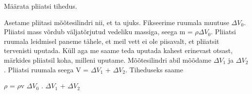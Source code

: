 
Määrata pliiatsi tihedus.

\hint

\solu
Asetame pliitasi mõõtesilindri nii, et ta ujuks. Fikseerime ruumala muutuse $\Delta$$V_0$. Pliiatsi mass võrdub väljatõrjutud vedeliku massiga, seega m = $\rho\Delta$$V_0$. Pliiatsi ruumala leidmisel paneme tähele, et meil vett ei ole piisavalt, et pliiatsit tervenisti uputada. Küll aga me saame teda uputada kahest erinevast otsast, märkides pliiatsil koha, milleni uputame. Mõõtesilindri abil mõõdame $\Delta$$V_1$ ja $\Delta$$V_2$. Pliiatsi ruumala seega V = $\Delta$$V_1$ + $\Delta$$V_2$. Tiheduseks saame

$\rho$ = $\rho$v $\Delta$$V_0$ . $\Delta$$V_1$ + $\Delta$$V_2$
\probend
